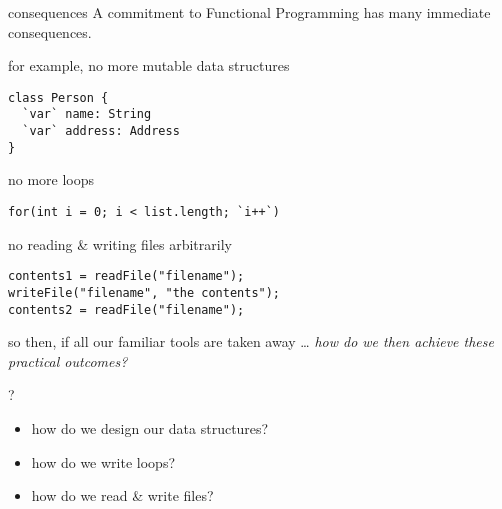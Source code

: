 \begin{frame}
\begin{block}{consequences}
A commitment to Functional Programming has many immediate consequences.
\end{block}
\end{frame}

\begin{frame}[fragile]
\begin{block}{for example, no more mutable data structures}
\begin{lstlisting}[style=java]
class Person {
  `var` name: String
  `var` address: Address
}
\end{lstlisting}
\end{block}
\end{frame}

\begin{frame}[fragile]
\begin{block}{no more loops}
\begin{lstlisting}[style=java]
for(int i = 0; i < list.length; `i++`)
\end{lstlisting}
\end{block}
\end{frame}

\begin{frame}[fragile]
\begin{block}{no reading \& writing files arbitrarily}
\begin{lstlisting}[style=java]
contents1 = readFile("filename");
writeFile("filename", "the contents");
contents2 = readFile("filename");
\end{lstlisting}
\end{block}

\end{frame}
\begin{frame}
\begin{block}{so then, if all our familiar tools are taken away \ldots}
\emph{how do we then achieve these practical outcomes?}
\end{block}
\end{frame}

\begin{frame}
\begin{block}{?}
\begin{itemize}
\item how do we design our data structures?
\item how do we write loops?
\item how do we read \& write files?
\end{itemize}
\end{block}
\end{frame}
